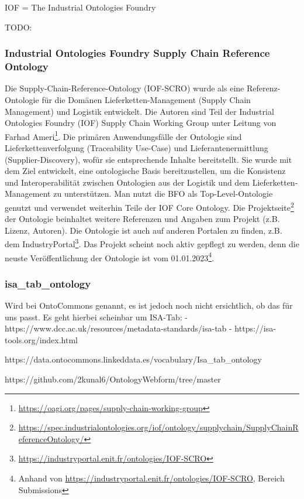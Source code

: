 \documentclass{article}
\begin{document}
IOF = The Industrial Ontologies Foundry

TODO: \cite{kulvatunyou2022}

\subsubsection{Industrial Ontologies Foundry Supply Chain Reference Ontology}

Die Supply-Chain-Reference-Ontology (IOF-SCRO) wurde als eine Referenz-Ontologie für die Domänen Lieferketten-Management (Supply Chain Management) und Logistik entwickelt\cite{ameri2020towards}.
Die Autoren sind Teil der Industrial Ontologies Foundry (IOF) Supply Chain Working Group unter Leitung von Farhad Ameri\footnote{\url{https://oagi.org/pages/supply-chain-working-group}}.
Die primären Anwendungsfälle der Ontologie sind Lieferkettenverfolgung (Traceability Use-Case) und Lieferantenermittlung (Supplier-Discovery), wofür sie entsprechende Inhalte bereitstellt.
Sie wurde mit dem Ziel entwickelt, eine ontologische Basis bereitzustellen, um die Konsistenz und Interoperabilität zwischen Ontologien aus der Logistik und dem Lieferketten-Management zu unterstützen.
Man nutzt die BFO als Top-Level-Ontologie genutzt und verwendet weiterhin Teile der IOF Core Ontology\cite{Kulvatunyou2022}.
Die Projektseite\footnote{\url{https://spec.industrialontologies.org/iof/ontology/supplychain/SupplyChainReferenceOntology/}} der Ontologie beinhaltet weitere Referenzen und Angaben zum Projekt (z.B. Lizenz, Autoren).
Die Ontologie ist auch auf anderen Portalen zu finden, z.B. dem IndustryPortal\footnote{\url{https://industryportal.enit.fr/ontologies/IOF-SCRO}}.
Das Projekt scheint noch aktiv gepflegt zu werden, denn die neuste Veröffentlichung der Ontologie ist vom 01.01.2023\footnote{Anhand von \url{https://industryportal.enit.fr/ontologies/IOF-SCRO}, Bereich Submissions}.

\subsubsection{isa\_tab\_ontology}

Wird bei OntoCommons genannt, es ist jedoch noch nicht ersichtlich, ob das für uns passt.
Es geht hierbei scheinbar um ISA-Tab:
- https://www.dcc.ac.uk/resources/metadata-standards/isa-tab
- https://isa-tools.org/index.html

https://data.ontocommons.linkeddata.es/vocabulary/Isa\_tab\_ontology

https://github.com/2kunal6/OntologyWebform/tree/master
\end{document}
